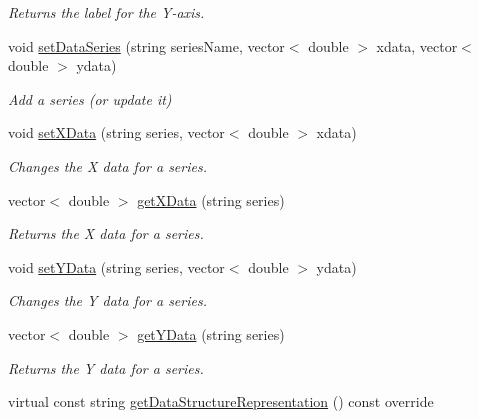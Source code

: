 \begin{DoxyCompactItemize}
\begin{DoxyCompactList}\small\item\em Returns the label for the Y-\/axis. \end{DoxyCompactList}\item 
void \mbox{\hyperlink{classbridges_1_1datastructure_1_1_line_chart_acb763ea4b2d0f27c73edc3861cc51fbb}{set\+Data\+Series}} (string series\+Name, vector$<$ double $>$ xdata, vector$<$ double $>$ ydata)
\begin{DoxyCompactList}\small\item\em Add a series (or update it) \end{DoxyCompactList}\item 
void \mbox{\hyperlink{classbridges_1_1datastructure_1_1_line_chart_aa9959489d71e31645f561c4481f050d2}{set\+X\+Data}} (string series, vector$<$ double $>$ xdata)
\begin{DoxyCompactList}\small\item\em Changes the X data for a series. \end{DoxyCompactList}\item 
vector$<$ double $>$ \mbox{\hyperlink{classbridges_1_1datastructure_1_1_line_chart_af624657af0ddd7d58c1d9290b4874280}{get\+X\+Data}} (string series)
\begin{DoxyCompactList}\small\item\em Returns the X data for a series. \end{DoxyCompactList}\item 
void \mbox{\hyperlink{classbridges_1_1datastructure_1_1_line_chart_a861370f3f7b32cc1a9347727d084d307}{set\+Y\+Data}} (string series, vector$<$ double $>$ ydata)
\begin{DoxyCompactList}\small\item\em Changes the Y data for a series. \end{DoxyCompactList}\item 
vector$<$ double $>$ \mbox{\hyperlink{classbridges_1_1datastructure_1_1_line_chart_a6a895cf47836585f8415e4d29e092085}{get\+Y\+Data}} (string series)
\begin{DoxyCompactList}\small\item\em Returns the Y data for a series. \end{DoxyCompactList}\item 
virtual const string \mbox{\hyperlink{classbridges_1_1datastructure_1_1_line_chart_a1e032b058e13ea08a449516698f438ac}{get\+Data\+Structure\+Representation}} () const override
\end{DoxyCompactItemize}


